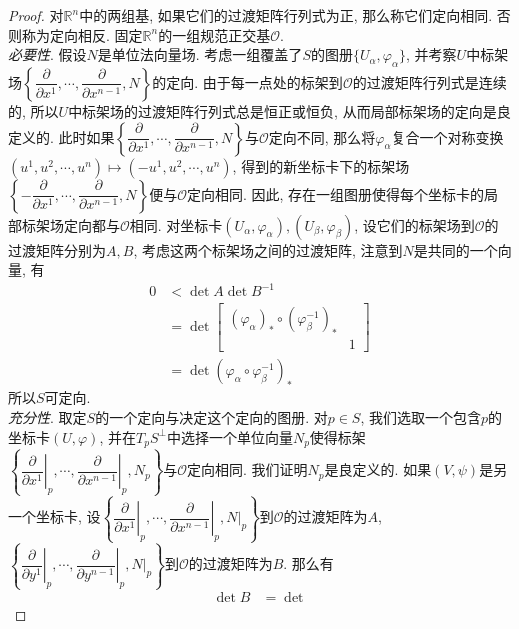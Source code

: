 \begin{proof}
    对$\mathbb{R}^n$中的两组基, 如果它们的过渡矩阵行列式为正, 那么称它们定向相同.
    否则称为定向相反.
    固定$\mathbb{R}^n$的一组规范正交基$\mathcal{O}$.\\
    \textit{必要性}.
    假设$N$是单位法向量场.
    考虑一组覆盖了$S$的图册$\{U_\alpha,\varphi_\alpha\}$, 并考察$U$中标架场$\left\{\dfrac{\partial}{\partial x^1},\cdots,\dfrac{\partial}{\partial x^{n-1}},N\right\}$的定向.
    由于每一点处的标架到$\mathcal{O}$的过渡矩阵行列式是连续的, 所以$U$中标架场的过渡矩阵行列式总是恒正或恒负, 从而局部标架场的定向是良定义的.
    此时如果$\left\{\dfrac{\partial}{\partial x^1},\cdots,\dfrac{\partial}{\partial x^{n-1}},N\right\}$与$\mathcal{O}$定向不同, 那么将$\varphi_\alpha$复合一个对称变换$(u^1,u^2,\cdots,u^n)\mapsto(-u^1,u^2,\cdots,u^n)$, 得到的新坐标卡下的标架场$\left\{-\dfrac{\partial}{\partial x^1},\cdots,\dfrac{\partial}{\partial x^{n-1}},N\right\}$便与$\mathcal{O}$定向相同.
    因此, 存在一组图册使得每个坐标卡的局部标架场定向都与$\mathcal{O}$相同.
    对坐标卡$(U_\alpha,\varphi_\alpha),(U_\beta,\varphi_\beta)$, 设它们的标架场到$\mathcal{O}$的过渡矩阵分别为$A,B$, 考虑这两个标架场之间的过渡矩阵, 注意到$N$是共同的一个向量, 有
    \begin{align*}
        0&<\det{A}\det{B^{-1}}\\
        &=\det\begin{bmatrix}
            (\varphi_\alpha)_*\circ(\varphi_\beta^{-1})_* & \\
             & 1
        \end{bmatrix}\\
        &=\det(\varphi_\alpha\circ\varphi_\beta^{-1})_*
    \end{align*}
    所以$S$可定向.\\
    \textit{充分性}.
    取定$S$的一个定向与决定这个定向的图册.
    对$p\in S$, 我们选取一个包含$p$的坐标卡$(U,\varphi)$, 并在$T_pS^\perp$中选择一个单位向量$N_p$使得标架$\left\{\left.\dfrac{\partial}{\partial x^1}\right|_p,\cdots,\left.\dfrac{\partial}{\partial x^{n-1}}\right|_p,N_p\right\}$与$\mathcal{O}$定向相同.
    我们证明$N_p$是良定义的.
    如果$(V,\psi)$是另一个坐标卡, 设$\left\{\left.\dfrac{\partial}{\partial x^1}\right|_p,\cdots,\left.\dfrac{\partial}{\partial x^{n-1}}\right|_p,N|_p\right\}$到$\mathcal{O}$的过渡矩阵为$A$, $\left\{\left.\dfrac{\partial}{\partial y^1}\right|_p,\cdots,\left.\dfrac{\partial}{\partial y^{n-1}}\right|_p,N|_p\right\}$到$\mathcal{O}$的过渡矩阵为$B$.
    那么有
    \begin{align*}
        \det{B}&=\det{
}
\end{align*}
\end{proof}
